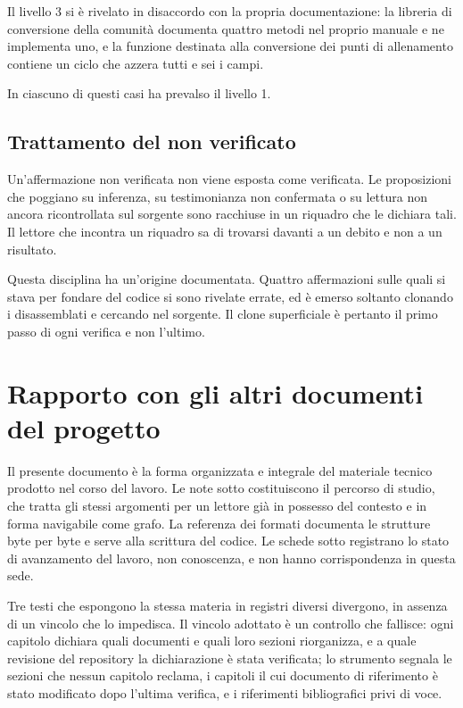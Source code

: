 Il livello 3 si è rivelato in disaccordo con la propria documentazione: la libreria di
conversione della comunità documenta quattro metodi nel proprio manuale e ne implementa uno,
e la funzione destinata alla conversione dei punti di allenamento contiene un ciclo che
azzera tutti e sei i campi.

In ciascuno di questi casi ha prevalso il livello 1.

\subsection*{Trattamento del non verificato}

Un'affermazione non verificata non viene esposta come verificata. Le proposizioni che
poggiano su inferenza, su testimonianza non confermata o su lettura non ancora ricontrollata
sul sorgente sono racchiuse in un riquadro che le dichiara tali. Il lettore che incontra un
riquadro sa di trovarsi davanti a un debito e non a un risultato.

Questa disciplina ha un'origine documentata. Quattro affermazioni sulle quali si stava per
fondare del codice si sono rivelate errate, ed è emerso soltanto clonando i disassemblati e
cercando nel sorgente. Il clone superficiale è pertanto il primo passo di ogni verifica e
non l'ultimo.

\section*{Rapporto con gli altri documenti del progetto}

Il presente documento è la forma organizzata e integrale del materiale tecnico prodotto nel
corso del lavoro. Le note sotto  costituiscono il percorso di studio, che tratta
gli stessi argomenti per un lettore già in possesso del contesto e in forma navigabile come
grafo. La referenza dei formati documenta le strutture byte per byte e serve alla scrittura
del codice. Le schede sotto  registrano lo stato di avanzamento del lavoro,
non conoscenza, e non hanno corrispondenza in questa sede.

Tre testi che espongono la stessa materia in registri diversi divergono, in assenza di un
vincolo che lo impedisca. Il vincolo adottato è un controllo che fallisce: ogni capitolo
dichiara quali documenti e quali loro sezioni riorganizza, e a quale revisione del
repository la dichiarazione è stata verificata; lo strumento 
segnala le sezioni che nessun capitolo reclama, i capitoli il cui documento di riferimento
è stato modificato dopo l'ultima verifica, e i riferimenti bibliografici privi di voce.

